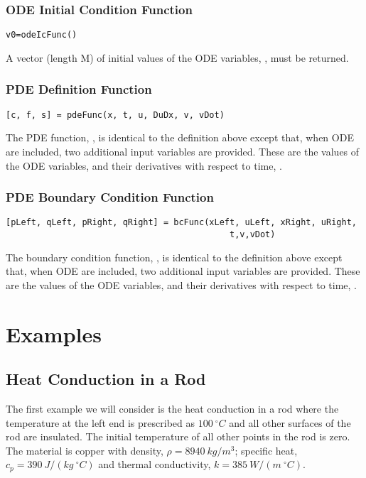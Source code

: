 \documentclass{article}
\begin{document}
\subsubsection{ODE Initial Condition Function}
\begin{lstlisting}
v0=odeIcFunc()
\end{lstlisting}
A vector (length M) of initial values of the ODE variables, , must be returned.

\subsubsection{PDE Definition Function}
\begin{lstlisting}
[c, f, s] = pdeFunc(x, t, u, DuDx, v, vDot)
\end{lstlisting}
The PDE function, , is identical to the definition
above except that, when ODE are included, two additional input variables
are provided. These are the values of the ODE variables,  and their
derivatives with respect to time, .

\subsubsection{PDE Boundary Condition Function}
\begin{lstlisting}
[pLeft, qLeft, pRight, qRight] = bcFunc(xLeft, uLeft, xRight, uRight, 
                                            t,v,vDot)                                       
\end{lstlisting}
The boundary condition function, , is 
identical to the definition
above except that, when ODE are included, two additional input variables
are provided. These are the values of the ODE variables,  and their
derivatives with respect to time, .

\section{Examples}

\subsection{Heat Conduction in a Rod}
The first example we will consider is the heat conduction in a rod where the
temperature at the left end is prescribed as $100\ ^{\circ}C$ and all other
surfaces of the rod are insulated. The initial temperature of all other points
in the rod is zero. The material is copper with density,  $\rho=8940\ kg/m^3$;
specific heat, $c_p=390\ J/(kg\ ^{\circ}C)$ and thermal conductivity, $k=385\ W/(m\ ^{\circ}C)$.
\end{document}

